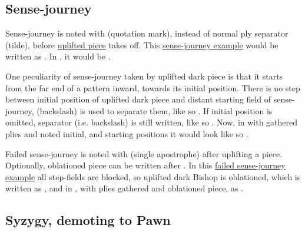 \subsection*{Sense-journey}
\label{sec:Appendix/Notation/Sense-journey}

Sense-journey is noted with  (quotation mark), instead of normal ply separator
\alg{\textasciitilde{}} (tilde), before \hyperref[fig:scn_o_42_uplifting_step]{uplifted piece} takes
off. This \hyperref[fig:scn_o_45_dark_piece_sense_journey]{sense-journey example} would
be written as .
In , it would be
.

One peculiarity of sense-journey taken by uplifted dark piece is that it starts from
the far end of a pattern inward, towards its initial position. There is no step between
initial position of uplifted dark piece and distant starting field of sense-journey,
\alg{\textbackslash} (backslash) is used to separate them, like so
.
If initial position is omitted, separator (i.e. backslash) is still written, like so
.
Now, in  with gathered plies and noted initial, and starting positions it would look
like so\newline
{}\newline
\alg{[Bc5\textbackslash{}z11-n7]}.

Failed sense-journey is noted with  (single apostrophe) after uplifting a
piece. Optionally, oblationed piece can be written after . In this
\hyperref[fig:scn_o_46_sense_journey_failed]{failed sense-journey example} all
step-fields are blocked, so uplifted dark Bishop is oblationed, which is written as
, and in , with plies gathered and oblationed
piece, as .

\vfill

\subsection*{Syzygy, demoting to Pawn}
\label{sec:Appendix/Notation/Syzygy, demoting to Pawn}

